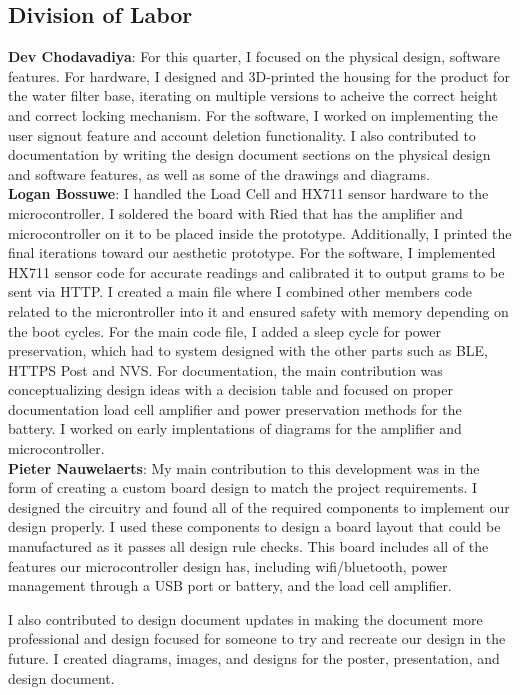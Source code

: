 \subsection{Division of Labor}

\noindent\textbf{Dev Chodavadiya}:
For this quarter, I focused on the physical design, software features. For hardware, I designed and 3D-printed the housing for the product for the water filter base, iterating on multiple versions to acheive the correct height and correct locking mechanism. For the software, I worked on implementing the user signout feature and account deletion functionality. I also contributed to documentation by writing the design document sections on the physical design and software features, as well as some of the drawings and diagrams.\\

\noindent\textbf{Logan Bossuwe}:
I handled the Load Cell and HX711 sensor hardware to the microcontroller. I soldered the board with Ried that has the amplifier and microcontroller on it to be placed inside the prototype. Additionally, I printed the final iterations toward our aesthetic prototype. For the software, I implemented HX711 sensor code for accurate readings and calibrated it to output grams to be sent via HTTP. I created a main file where I combined other members code related to the microntroller into it and ensured safety with memory depending on the boot cycles.
For the main code file, I added a sleep cycle for power preservation, which had to system designed with the other parts such as BLE, HTTPS Post and NVS. For documentation, the main contribution was conceptualizing design ideas with a decision table and focused on proper documentation load cell amplifier and power preservation methods for the battery. I worked on early implentations of diagrams for the amplifier and microcontroller.\\

\noindent\textbf{Pieter Nauwelaerts}:
My main contribution to this development was in the form of creating a custom board design to match the project requirements. I designed the circuitry and found all of the required components to implement our design properly. I  used these components to design a board layout that could be manufactured as it passes all design rule checks. This board includes all of the features our microcontroller design has, including wifi/bluetooth, power management through a USB port or battery, and the load cell amplifier. 

I also contributed to design document updates in making the document more professional and design focused for someone to try and recreate our design in the future. I created diagrams, images, and designs for the poster, presentation, and design document. \\

